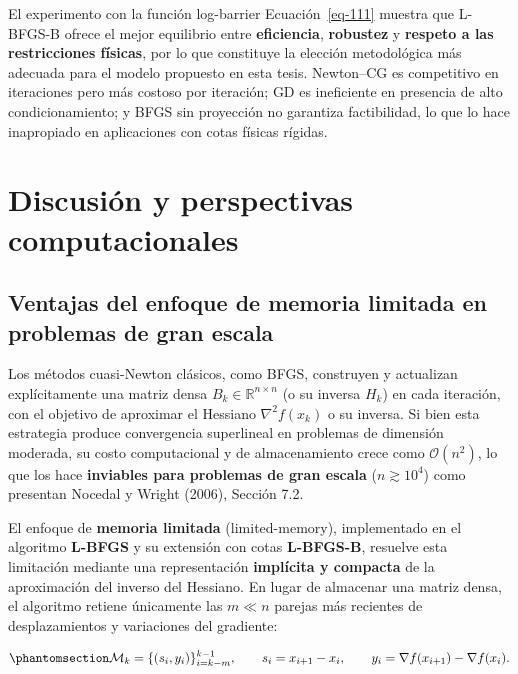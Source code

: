\documentclass[
  spanish,
  us-letterpaper,
]{scrreprt}
\numberwithin{equation}{section}
\begin{document}
El experimento con la función log-barrier Ecuación~\ref{eq-111} muestra
que L-BFGS-B ofrece el mejor equilibrio entre \textbf{eficiencia},
\textbf{robustez} y \textbf{respeto a las restricciones físicas}, por lo
que constituye la elección metodológica más adecuada para el modelo
propuesto en esta tesis. Newton--CG es competitivo en iteraciones pero
más costoso por iteración; GD es ineficiente en presencia de alto
condicionamiento; y BFGS sin proyección no garantiza factibilidad, lo
que lo hace inapropiado en aplicaciones con cotas físicas rígidas.

\section{Discusión y perspectivas
computacionales}\label{discusiuxf3n-y-perspectivas-computacionales}

\subsection{Ventajas del enfoque de memoria limitada en problemas de
gran
escala}\label{ventajas-del-enfoque-de-memoria-limitada-en-problemas-de-gran-escala}

Los métodos cuasi-Newton clásicos, como BFGS, construyen y actualizan
explícitamente una matriz densa \(B_k \in \mathbb{R}^{n \times n}\) (o
su inversa \(H_k\)) en cada iteración, con el objetivo de aproximar el
Hessiano \(\nabla^2 f(x_k)\) o su inversa. Si bien esta estrategia
produce convergencia superlineal en problemas de dimensión moderada, su
costo computacional y de almacenamiento crece como \(\mathcal{O}(n^2)\),
lo que los hace \textbf{inviables para problemas de gran escala}
(\(n \gtrsim 10^4\)) como presentan Nocedal y Wright (2006), Sección
7.2.

El enfoque de \textbf{memoria limitada} (limited-memory), implementado
en el algoritmo \textbf{L-BFGS} y su extensión con cotas
\textbf{L-BFGS-B}, resuelve esta limitación mediante una representación
\textbf{implícita y compacta} de la aproximación del inverso del
Hessiano. En lugar de almacenar una matriz densa, el algoritmo retiene
únicamente las \(m \ll n\) parejas más recientes de desplazamientos y
variaciones del gradiente:

\begin{equation}\phantomsection\label{eq-120}{
\mathcal{M}_k = \{ (s_i, y_i) \}_{i=k-m}^{k-1}, 
\qquad 
s_i = x_{i+1} - x_i, 
\qquad 
y_i = \nabla f(x_{i+1}) - \nabla f(x_i).
}\end{equation}
\end{document}
